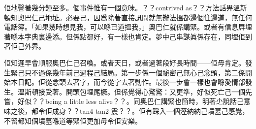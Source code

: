 佢地謦著幾分鐘至多。個事件惟有一個意味。？？contrived as？？方法話畀溫斯頓知奧巴仁己地址。必要己，因爲除著直接訊問就無辦法搵都邊個住邊道，無任何電話簿。「如果幾時想見我，可以喺已道搵我，」奧巴仁就係講緊。或者有信息屛埋著喺本字典裏邊添。但係點都好，有一樣也肯定。夢中己串謀眞係存在，同埋佢到著佢己外界。

佢知遲早會順服奧巴仁己召喚。或者天日，或者過著段好長時間——佢毋肯定。發生緊己只不過係幾年前己過程己結局。第一步係一個祕密己無心己念頭，第二係開始本日記。佢從念頭去著字，而今從字去著動作。最後一步會一樣也會喺愛情部發生。溫斯頓接受著。開頭包埋尾橛。但係覺得心驚驚：又更準，好似死亡己一個先嘗，好似？？being a little less alive？？。同奧巴仁講緊也箇時，明著尐說話己意味之後，都令佢成身？？tan4 tan2 震？？。佢有踩入一個溼納納己墳墓己感覺，不留都知個墳墓喺道等緊佢更加毋令佢安樂。
